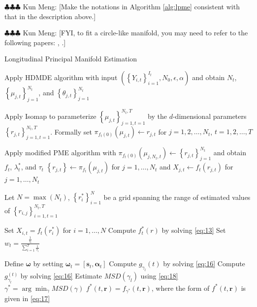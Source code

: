 \documentclass[11pt,reqno]{article}
\newcommand{\meng}[1]{{\color{purple} \sf $\clubsuit\clubsuit\clubsuit$ Kun Meng: [#1]}}
\theoremstyle{definition}
\begin{document}
\meng{Make the notations in Algorithm \ref{alg:lpme} consistent with that in the description above.}

\meng{FYI, to fit a circle-like manifold, you may need to refer to the following papers: \cite{fasy2014confidence}, \cite{dunsonInferringManifoldsNoisy2022}.}

\begin{algorithm}
\caption{Longitudinal Principal Manifold Estimation}\label{alg:lpme}
 {
  Apply HDMDE algorithm with input $\left(\left\{Y_{i, t}\right\}_{i = 1}^{I_t}, N_0, \epsilon, \alpha\right)$ and obtain $N_t$, $\left\{\mu_{j, t}\right\}_{j = 1}^{N_t}$, and $\left\{\theta_{j, t}\right\}_{j = 1}^{N_t}$\;
}

  Apply Isomap to parameterize $\left\{\mu_{j, t}\right\}_{j = 1, t = 1}^{N_t, T}$ by the $d$-dimensional parameters $\left\{r_{j, t}\right\}_{j = 1, t = 1}^{N_t, T}$. Formally set $\pi_{f_t(0)}(\mu_{j, t}) \gets r_{j, t}$ for $j = 1, 2, \dots, N_t$, $t = 1, 2, \dots, T$\;

 {
  Apply modified PME algorithm with $\pi_{f_t(0)}(\mu_{j, N_t, t}) \gets \left\{r_{j, t}\right\}_{j = 1}^{N_t}$ and obtain $f_t$, $\lambda_t^*$, and $\tau_t$\;
  $\left\{r_{j, t}\right\} \gets \pi_{f_t}(\mu_{j, t})$ for $j = 1, \dots, N_t$ and $X_{j, t} \gets f_t(r_{j, t})$ for $j = 1, \dots, N_t$\;
}

  Let $N = \max(N_t)$, $\left\{r_i^*\right\}_{i=1}^{N}$ be a grid spanning the range of estimated values of $\left\{r_{i, j}\right\}_{i=1, t=1}^{N_t, T}$\; 

 {
  Set $X_{i, t} = f_t(r_{i}^*)$ for $i = 1, \dots, N$\;
  Compute $f_t^*(r)$ by solving \eqref{eq:13}\;
  Set $w_t = \frac{\frac{1}{\tau_t}}{\sum_{i=1}^{T}\frac{1}{\tau_i}}$\;
}

  Define $\boldsymbol{\omega}$ by setting $\boldsymbol{\omega}_t = \left[\boldsymbol{s}_t, \boldsymbol{\alpha}_t\right]$\;
   {
    Compute $g_{\gamma_l}(t)$ by solving \eqref{eq:16}\;
     {
      Compute $g_{\gamma_l}^{(t)}$ by solving \eqref{eq:16}\;
    }
    Estimate $MSD(\gamma_l)$ using \eqref{eq:18}\;
  }
  $\gamma^* = \arg\min_{\gamma}MSD(\gamma)$\;
  $f^*(t, \boldsymbol{r}) = f_{\gamma^*}(t, \boldsymbol{r})$, where the form of $f^*(t, \boldsymbol{r})$ is given in \eqref{eq:17}
\end{algorithm}
\end{document}
